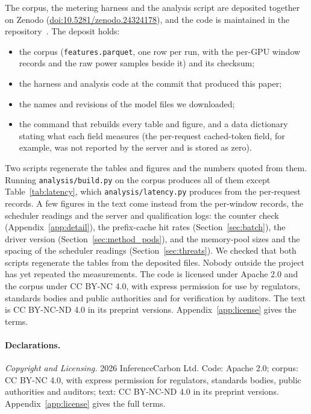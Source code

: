 \documentclass[11pt]{article}
\begin{document}
\begin{sloppypar}
The corpus, the metering harness and the analysis script are deposited together on Zenodo (\href{https://doi.org/10.5281/zenodo.24324178}{doi:10.5281/\allowbreak zenodo.24324178}), and the code is maintained in the repository~\citep{harness2026}. The deposit holds:
\begin{itemize}
\item the corpus (\texttt{features.parquet}, one row per run, with the per-GPU window records and the raw power samples beside it) and its checksum;
\item the harness and analysis code at the commit that produced this paper;
\item the names and revisions of the model files we downloaded;
\item the command that rebuilds every table and figure, and a data dictionary stating what each field measures (the per-request cached-token field, for example, was not reported by the server and is stored as zero).
\end{itemize}
Two scripts regenerate the tables and figures and the numbers quoted from them. Running \texttt{analysis/build.py} on the corpus produces all of them except Table~\ref{tab:latency}, which \texttt{analysis/latency.py} produces from the per-request records. A few figures in the text come instead from the per-window records, the scheduler readings and the server and qualification logs: the counter check (Appendix~\ref{app:detail}), the prefix-cache hit rates (Section~\ref{sec:batch}), the driver version (Section~\ref{sec:method_pods}), and the memory-pool sizes and the spacing of the scheduler readings (Section~\ref{sec:threats}). We checked that both scripts regenerate the tables from the deposited files. Nobody outside the project has yet repeated the measurements. The code is licensed under Apache 2.0 and the corpus under CC BY-NC 4.0, with express permission for use by regulators, standards bodies and public authorities and for verification by auditors. The text is CC BY-NC-ND 4.0 in its preprint versions. Appendix~\ref{app:license} gives the terms.
\end{sloppypar}

\paragraph{Declarations.}

\noindent\emph{Copyright and Licensing.} \textcopyright{} 2026 InferenceCarbon Ltd. Code: Apache 2.0; corpus: CC BY-NC 4.0, with express permission for regulators, standards bodies, public authorities and auditors; text: CC BY-NC-ND 4.0 in its preprint versions. Appendix~\ref{app:license} gives the full terms.
\end{document}
